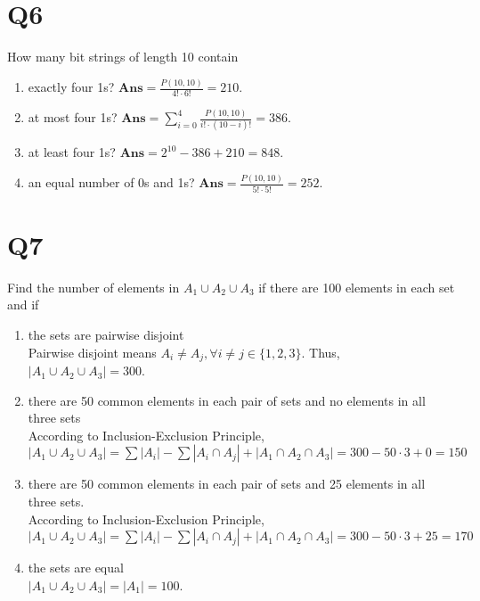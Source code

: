 \documentclass[a4paper,11pt]{article}
\newenvironment{qparts}{\begin{enumerate}[{(}a{)}]}{\end{enumerate}}
\begin{document}
\section*{Q6}
How many bit strings of length 10 contain
\begin{qparts}
    
    \item exactly four 1s?
    $\textbf{Ans}=\frac{P(10, 10)}{4!\cdot 6!}=210$.

    \item at most four 1s?
    $\textbf{Ans}=\sum_{i=0}^4 \frac{P(10 , 10)}{i! \cdot (10-i)!}=386$.

    \item at least four 1s?
    $\textbf{Ans}=2^{10}-386+210=848$.

    \item an equal number of 0s and 1s?
    $\textbf{Ans}=\frac{P(10, 10)}{5!\cdot 5!}=252$.
\end{qparts}

\section*{Q7}
Find the number of elements in $A_1 \cup  A_2 \cup  A_3$ if there are 100
elements in each set and if
\begin{qparts}
    
    \item the sets are pairwise disjoint\\
    Pairwise disjoint means $A_i\neq A_j, \forall i\neq j \in \{ 1,2,3 \}$. Thus, $\left\vert A_1 \cup A_2 \cup A_3 \right\vert =300$.

    \item there are 50 common elements in each pair of sets and no elements in all three sets\\
    According to Inclusion-Exclusion Principle, \\$
    \left\vert A_1 \cup A_2 \cup A_3 \right\vert=
    \sum\left\vert A_{i } \right\vert-\sum\left\vert A_{i} \cap A_{j } \right\vert+\left\vert A_1 \cap A_2 \cap A_3 \right\vert=300-50\cdot 3+0=150$

    \item there are 50 common elements in each pair of sets and 25 elements in all three sets.\\
    According to Inclusion-Exclusion Principle, \\$
    \left\vert A_1 \cup A_2 \cup A_3 \right\vert=
    \sum\left\vert A_{i } \right\vert-\sum\left\vert A_{i} \cap A_{j } \right\vert+\left\vert A_1 \cap A_2 \cap A_3 \right\vert=300-50\cdot 3+25=170$

    \item the sets are equal\\
    $\left\vert A_1 \cup A_2 \cup A_3 \right\vert=\left\vert A_1 \right\vert=100  $.
\end{qparts}
\end{document}
